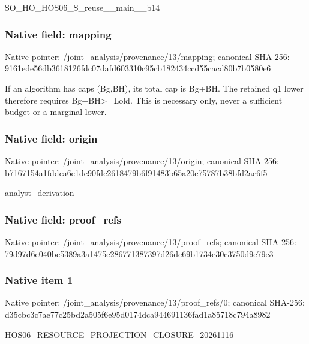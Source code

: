 \documentclass[10pt,a4paper]{article}
\begin{document}
\begingroup\raggedright\sloppy SO\_\allowbreak{}HO\_\allowbreak{}HOS06\_\allowbreak{}S\_\allowbreak{}reuse\_\allowbreak{}\_\allowbreak{}main\_\allowbreak{}\_\allowbreak{}b14\par\endgroup

\subsubsection{Native field: mapping}
Native pointer: /joint\_\allowbreak{}analysis/provenance/13/mapping; canonical SHA-256: 9161ede56db3618126fdc07dafd603310c95cb182434ccd55cacd80b7b0580e6

\begingroup\raggedright\sloppy If an algorithm has caps (Bg,\allowbreak{}BH),\allowbreak{} its total cap is Bg+BH. The retained q1 lower therefore requires Bg+BH>=\allowbreak{}Lold. This is necessary only,\allowbreak{} never a sufficient budget or a marginal lower.\par\endgroup

\subsubsection{Native field: origin}
Native pointer: /joint\_\allowbreak{}analysis/provenance/13/origin; canonical SHA-256: b7167154a1fddca6e1de90fdc2618479b6f91483b65a20e75787b38bfd2ae6f5

\begingroup\raggedright\sloppy analyst\_\allowbreak{}derivation\par\endgroup

\subsubsection{Native field: proof\_\allowbreak{}refs}
Native pointer: /joint\_\allowbreak{}analysis/provenance/13/proof\_\allowbreak{}refs; canonical SHA-256: 79d97d6e040bc5389a3a1475e286771387397d26dc69b1734e30c3750d9e79e3

\subsubsection{Native item 1}
Native pointer: /joint\_\allowbreak{}analysis/provenance/13/proof\_\allowbreak{}refs/0; canonical SHA-256: d35cbc3c7ae77c25bd2a505f6e95d0174dca944691136fad1a85718c794a8982

\begingroup\raggedright\sloppy HOS06\_\allowbreak{}RESOURCE\_\allowbreak{}PROJECTION\_\allowbreak{}CLOSURE\_\allowbreak{}20261116\par\endgroup
\end{document}
